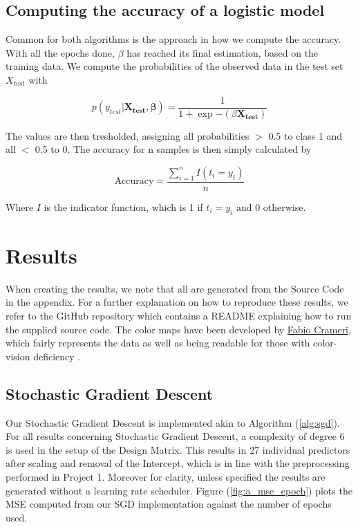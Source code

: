 \documentclass
[twocolumn,
secnumarabic,
nobibnotes,
aps,
prl,
reprint,
groupedaddress,
amsmath,
amssymb
]{revtex4-2}
\begin{document}
\subsection{Computing the accuracy of a logistic model}
Common for both algorithms is the approach in how we compute the accuracy. With all the epochs done, $\beta$ has reached its final estimation, based on the training data. We compute the probabilities of the observed data in the test set $X_{test}$ with

\begin{equation}
  \nonumber
  p(y_{test}|\bm{X_{test}},\bm{\beta}) = \frac{1}{1+\exp{-(\beta \boldsymbol{X_{test}})}}
\end{equation}

The values are then tresholded, assigning all probabilities $>$ 0.5 to class 1 and all $<$ 0.5 to 0. The accuracy for n samples is then simply calculated by

\begin{equation}
  \text{Accuracy} = \frac{\sum_{i=1}^n I(t_i = y_i)}{n}
\end{equation}

Where $I$ is the indicator function, which is 1 if $t_i = y_i$ and 0 otherwise.

\section{Results}
When creating the results, we note that all are generated from the Source Code in the appendix. For a further explanation on how to reproduce these results, we refer to the GitHub repository which contains a README explaining how to run the supplied source code. The color maps have been developed by \href{https://www.fabiocrameri.ch/colourmaps/}{Fabio Crameri}, which fairly represents the data as well as being readable for those with color-vision deficiency \cite{Crameri2021}.

\subsection{Stochastic Gradient Descent}
Our Stochastic Gradient Descent is implemented akin to Algorithm (\ref{alg:sgd}). For all results concerning Stochastic Gradient Descent, a complexity of degree 6 is used in the setup of the Design Matrix. This results in 27 individual predictors after scaling and removal of the Intercept, which is in line with the preprocessing performed in Project 1. Moreover for clarity, unless specified the results are generated without a learning rate scheduler.
Figure (\ref{fig:a_mse_epoch}) plots the MSE computed from our SGD implementation against the number of epochs used.
\end{document}
